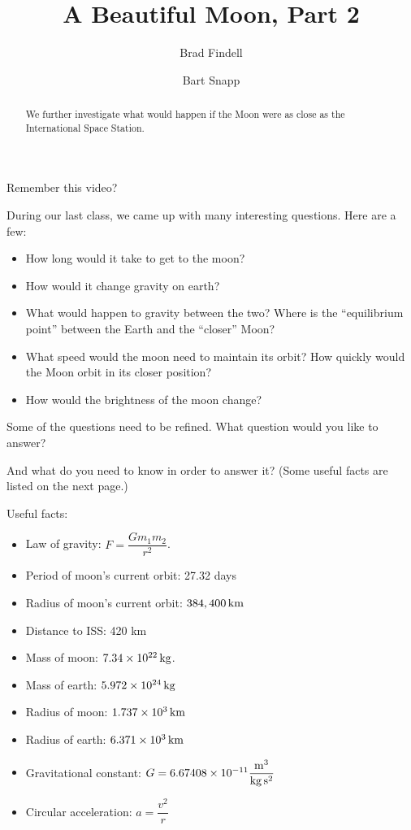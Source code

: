 \documentclass{ximera}
\author{Brad Findell \and Bart Snapp}
\title{A Beautiful Moon, Part 2}
\begin{document}
\begin{abstract}
We further investigate what would happen if the Moon were as close as the
International Space Station.
\end{abstract}
\maketitle
Remember this video?  

\begin{problem}
 During our last class, we came up with many interesting questions.   Here are a few:

\begin{itemize}
\item How long would it take to get to the moon? 
\item How would it change gravity on earth? 
\item What would happen to gravity between the two?     Where is the ``equilibrium point'' between the
   Earth and the ``closer'' Moon?
\item What speed would the moon need to maintain its orbit?   How quickly would the Moon orbit in its closer position?
\item  How would the brightness of the moon change?
 \end{itemize}

Some of the questions need to be refined.  What question would you like to answer?  

And what do you need to know in order to answer it?  (Some useful facts are listed on the next page.)  

\newpage
Useful facts:   
 
\begin{itemize}
\item Law of gravity:  $F=\dfrac{Gm_1m_2}{r^2}$.
\item Period of moon's current orbit:  27.32 days
\item Radius of moon's current orbit:  $384,400 \, \rm{km}$
\item Distance to ISS: 420 km
\item Mass of moon: $7.34\times 10^{22}\, \rm{kg}$.
\item Mass of earth: $5.972\times 10^{24}\, \rm{kg}$
\item Radius of moon: $1.737\times 10^3\, \rm{km}$
\item Radius of earth: $6.371\times 10^3\, \rm{km}$
\item Gravitational constant:  $G = 6.67408\times 10^{-11} \dfrac{\rm{m}^3}{ \rm{kg} \, \rm{ s}^2}$
\item Circular acceleration: $a=\dfrac{v^2}{r}$
\end{itemize}
 
\end{problem}
\end{document}
